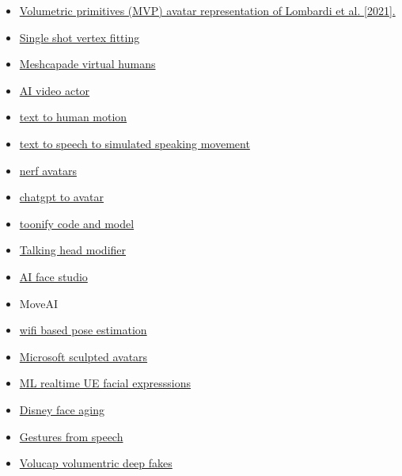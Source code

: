 \begin{itemize}
  \begin{itemize}
  \item
    \href{https://dl.acm.org/doi/abs/10.1145/3528233.3530740}{Volumetric
    primitives (MVP) avatar representation of Lombardi et al.
    {[}2021{]}.}
  \item
    \href{https://arxiv.org/abs/2205.06254}{Single shot vertex fitting}
  \item
    \href{https://meshcapade.com/}{Meshcapade virtual humans}
  \item
    \href{https://share.synthesia.io/a5a12c73-09cb-4455-b007-147ae4b1effb}{AI
    video actor}
  \item
    \href{https://ofa-sys.github.io/MoFusion/}{text to human motion}
  \item
    \href{https://talkshow.is.tue.mpg.de/}{text to speech to simulated
    speaking movement}
  \item
    \href{https://www.linkedin.com/posts/reneschulte_nerf-deeplearning-metaverse-activity-7010898662465617921-56P_?utm_source=share\&utm_medium=member_desktop}{nerf
    avatars}
  \item
    \href{https://twitter.com/IntuitMachine/status/1608690077139599360}{chatgpt
    to avatar}
  \item
    \href{https://www.mmlab-ntu.com/project/vtoonify/}{toonify code and
    model}
  \item
    \href{https://github.com/Meta-Portrait/MetaPortrait}{Talking head
    modifier}
  \item
    \href{https://www.d-id.com/}{AI face studio}
  \item
    MoveAI
  \item
    \href{http://arxiv.org/pdf/2301.00250.pdf}{wifi based pose
    estimation}
  \item
    \href{https://3d-avatar-diffusion.microsoft.com/?utm_campaign=AI\%20Art\%20Weekly\&utm_medium=email\&utm_source=Revue\%20newsletter\#/}{Microsoft
    sculpted avatars}
  \item
    \href{https://80.lv/articles/ziva-dynamics-announces-a-new-ml-trained-facial-rigging-service/}{ML
    realtime UE facial expresssions}
  \item
    \href{https://studios.disneyresearch.com/2022/11/30/production-ready-face-re-aging-for-visual-effects/}{Disney
    face aging}
  \item
    \href{https://talkshow.is.tue.mpg.de/}{Gestures from speech}
  \item
    \href{https://volucap.com/}{Volucap volumentric deep fakes}

\end{itemize}
\end{itemize}
